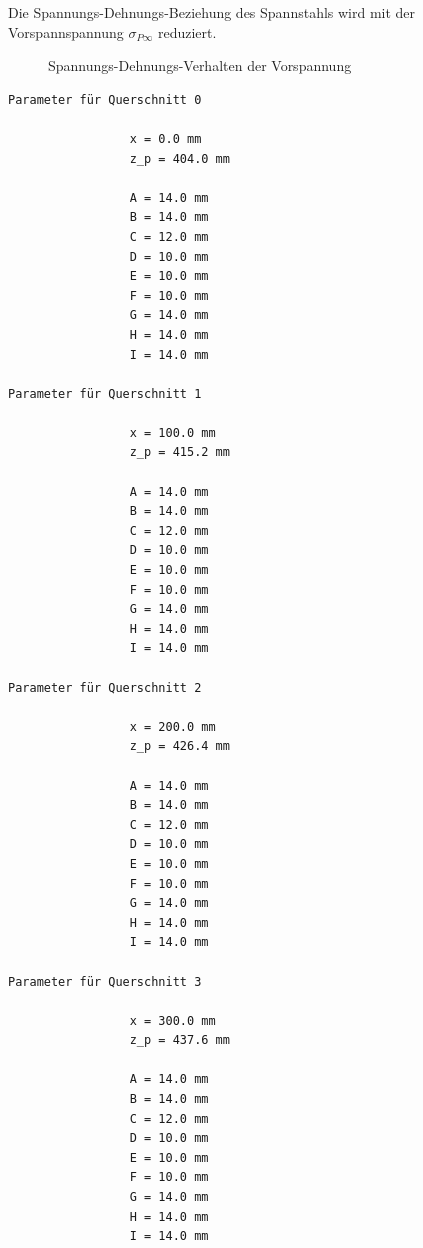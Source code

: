 \documentclass[
  11pt,
  letterpaper,
]{scrreprt}
\begin{document}
Die Spannungs-Dehnungs-Beziehung des Spannstahls wird mit der
Vorspannspannung \(\sigma_{P\infty}\) reduziert.

\begin{figure}[H]


\caption{\label{fig-sigma_eps_vorspannung_t6}Spannungs-Dehnungs-Verhalten
der Vorspannung}

\end{figure}%

\begin{verbatim}
Parameter für Querschnitt 0 

                 x = 0.0 mm
                 z_p = 404.0 mm 

                 A = 14.0 mm
                 B = 14.0 mm
                 C = 12.0 mm
                 D = 10.0 mm
                 E = 10.0 mm
                 F = 10.0 mm
                 G = 14.0 mm
                 H = 14.0 mm
                 I = 14.0 mm
            
Parameter für Querschnitt 1 

                 x = 100.0 mm
                 z_p = 415.2 mm 

                 A = 14.0 mm
                 B = 14.0 mm
                 C = 12.0 mm
                 D = 10.0 mm
                 E = 10.0 mm
                 F = 10.0 mm
                 G = 14.0 mm
                 H = 14.0 mm
                 I = 14.0 mm
            
Parameter für Querschnitt 2 

                 x = 200.0 mm
                 z_p = 426.4 mm 

                 A = 14.0 mm
                 B = 14.0 mm
                 C = 12.0 mm
                 D = 10.0 mm
                 E = 10.0 mm
                 F = 10.0 mm
                 G = 14.0 mm
                 H = 14.0 mm
                 I = 14.0 mm
            
Parameter für Querschnitt 3 

                 x = 300.0 mm
                 z_p = 437.6 mm 

                 A = 14.0 mm
                 B = 14.0 mm
                 C = 12.0 mm
                 D = 10.0 mm
                 E = 10.0 mm
                 F = 10.0 mm
                 G = 14.0 mm
                 H = 14.0 mm
                 I = 14.0 mm
            

\end{verbatim}
\end{document}
